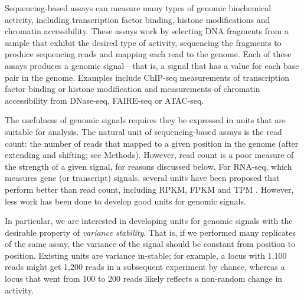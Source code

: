 \documentclass[11pt]{article}
\begin{document}
Sequencing-based assays can measure many types of genomic biochemical activity, including transcription factor binding, histone modifications and chromatin accessibility. 
These assays work by selecting DNA fragments from a sample that exhibit the desired type of activity, sequencing the fragments to produce sequencing reads and mapping each read to the genome.
Each of these assays produces a genomic signal---that is, a signal that has a value for each base pair in the genome.
Examples include ChIP-seq measurements of transcription factor binding or histone modification and measurements of chromatin accessibility from DNase-seq, FAIRE-seq or ATAC-seq. 




The usefulness of genomic signals requires they be expressed in units that are suitable for analysis.
The natural unit of sequencing-based assays is the read count: the number of reads that mapped to a given position in the genome (after extending and shifting; see Methods). 
However, read count is a poor measure of the strength of a given signal, for reasons discussed below.
For RNA-seq, which measures gene (or transcript) signals, several units have been proposed that perform better than read count, including RPKM, FPKM and TPM \cite{wagner2012measurement,conesa2016survey}.
However, less work has been done to develop good units for genomic signals. 

In particular, we are interested in developing units for genomic signals with the desirable property of \emph{variance stability}.
That is, if we performed many replicates of the same assay, the variance of the signal should be constant from position to position. 
Existing units are variance in-stable; for example, a locus with 1,100 reads might get 1,200 reads in a subsequent experiment by chance, whereas a locus that went from 100 to 200 reads likely reflects a non-random change in activity.
\end{document}
